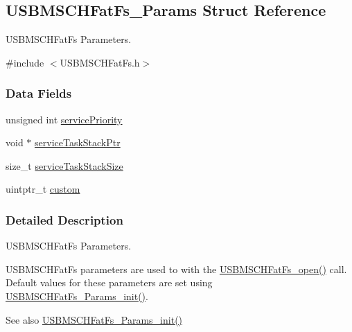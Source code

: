 \subsection{U\+S\+B\+M\+S\+C\+H\+Fat\+Fs\+\_\+\+Params Struct Reference}
\label{struct_u_s_b_m_s_c_h_fat_fs___params}


U\+S\+B\+M\+S\+C\+H\+Fat\+Fs Parameters.  




{\ttfamily \#include $<$U\+S\+B\+M\+S\+C\+H\+Fat\+Fs.\+h$>$}

\subsubsection*{Data Fields}
\begin{DoxyCompactItemize}
\item 
unsigned int \hyperlink{struct_u_s_b_m_s_c_h_fat_fs___params_aeb87fb7c375ba66138e4379ae9d5c786}{service\+Priority}
\item 
void $\ast$ \hyperlink{struct_u_s_b_m_s_c_h_fat_fs___params_a76c517fe62891079c9f04de90a6a4334}{service\+Task\+Stack\+Ptr}
\item 
size\+\_\+t \hyperlink{struct_u_s_b_m_s_c_h_fat_fs___params_a78253d7819c9c921daa7d652b0b61812}{service\+Task\+Stack\+Size}
\item 
uintptr\+\_\+t \hyperlink{struct_u_s_b_m_s_c_h_fat_fs___params_a665e71dc3924d9c80b987da2e705a74b}{custom}
\end{DoxyCompactItemize}


\subsubsection{Detailed Description}
U\+S\+B\+M\+S\+C\+H\+Fat\+Fs Parameters. 

U\+S\+B\+M\+S\+C\+H\+Fat\+Fs parameters are used to with the \hyperlink{_u_s_b_m_s_c_h_fat_fs_8h_a64956f1bd732672e4cd5592a4fef4a09}{U\+S\+B\+M\+S\+C\+H\+Fat\+Fs\+\_\+open()} call. Default values for these parameters are set using \hyperlink{_u_s_b_m_s_c_h_fat_fs_8h_ae46d9bf936f1837eddea6e787954afec}{U\+S\+B\+M\+S\+C\+H\+Fat\+Fs\+\_\+\+Params\+\_\+init()}.

\begin{DoxySeeAlso}{See also}
\hyperlink{_u_s_b_m_s_c_h_fat_fs_8h_ae46d9bf936f1837eddea6e787954afec}{U\+S\+B\+M\+S\+C\+H\+Fat\+Fs\+\_\+\+Params\+\_\+init()} 
\end{DoxySeeAlso}


